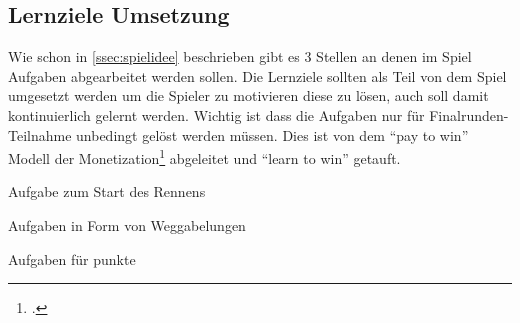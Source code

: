 \subsection{Lernziele Umsetzung}
	Wie schon in \ref{ssec:spielidee} beschrieben gibt es 3 Stellen an denen im Spiel Aufgaben abgearbeitet werden sollen. Die Lernziele sollten als Teil von dem Spiel umgesetzt werden um die Spieler zu motivieren diese zu lösen, auch soll damit kontinuierlich gelernt werden. Wichtig ist dass die Aufgaben nur für Finalrunden-Teilnahme unbedingt gelöst werden müssen.
	Dies ist von dem \enquote{pay to win} Modell der Monetization\footcite{freemium} abgeleitet und \enquote{learn to win} getauft.
	\begin{description}
		\item[Aufgabe zum Start des Rennens]{
		}
		\item[Aufgaben in Form von Weggabelungen]{
		}
		\item[Aufgaben für punkte]{
		}
	\end{description}
